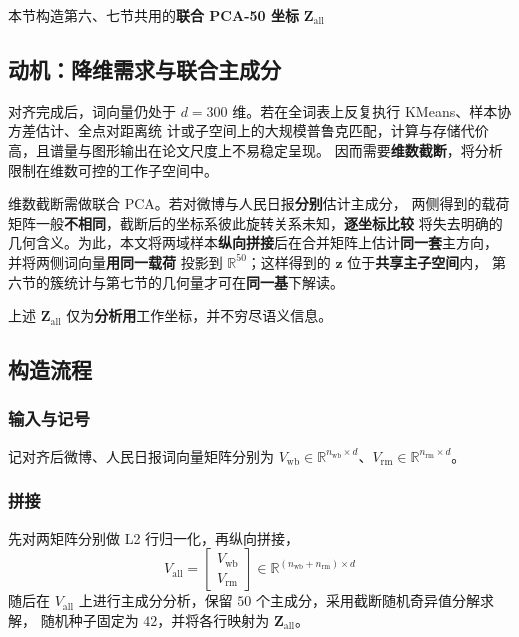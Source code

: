 \documentclass[withoutpreface]{cumcmthesis}
\begin{document}
本节构造第六、七节共用的\textbf{联合 PCA-50 坐标} $\mathbf{Z}_{\mathrm{all}}$

\subsection{动机：降维需求与联合主成分}

对齐完成后，词向量仍处于 $d=300$ 维。若在全词表上反复执行 KMeans、样本协方差估计、全点对距离统
计或子空间上的大规模普鲁克匹配，计算与存储代价高，且谱量与图形输出在论文尺度上不易稳定呈现。
因而需要\textbf{维数截断}，将分析限制在维数可控的工作子空间中。

维数截断需做联合 PCA。若对微博与人民日报\textbf{分别}估计主成分，
两侧得到的载荷矩阵一般\textbf{不相同}，截断后的坐标系彼此旋转关系未知，\textbf{逐坐标比较}
将失去明确的几何含义。为此，本文将两域样本\textbf{纵向拼接}后在合并矩阵上估计\textbf{同一套}主方向，
并将两侧词向量\textbf{用同一载荷}
投影到 $\mathbb{R}^{50}$；这样得到的 $\mathbf{z}$ 位于\textbf{共享主子空间}内，
第六节的簇统计与第七节的几何量才可在\textbf{同一基}下解读。

上述 $\mathbf{Z}_{\mathrm{all}}$ 仅为\textbf{分析用}工作坐标，并不穷尽语义信息。

\subsection{构造流程}

\subsubsection{输入与记号}
记对齐后微博、人民日报词向量矩阵分别为 $V_{\mathrm{wb}}\in\mathbb{R}^{n_{\mathrm{wb}}\times d}$、$V_{\mathrm{rm}}\in\mathbb{R}^{n_{\mathrm{rm}}\times d}$。

\subsubsection{拼接}
先对两矩阵分别做 L2 行归一化，再纵向拼接，
\begin{equation}
  V_{\mathrm{all}} = \begin{bmatrix} V_{\mathrm{wb}} \\ V_{\mathrm{rm}} \end{bmatrix}\in\mathbb{R}^{(n_{\mathrm{wb}}+n_{\mathrm{rm}})\times d}
\end{equation}
随后在 $V_{\mathrm{all}}$ 上进行主成分分析，保留 $50$ 个主成分，采用截断随机奇异值分解求解，
随机种子固定为 $42$，并将各行映射为 $\mathbf{Z}_{\mathrm{all}}$。
\end{document}
